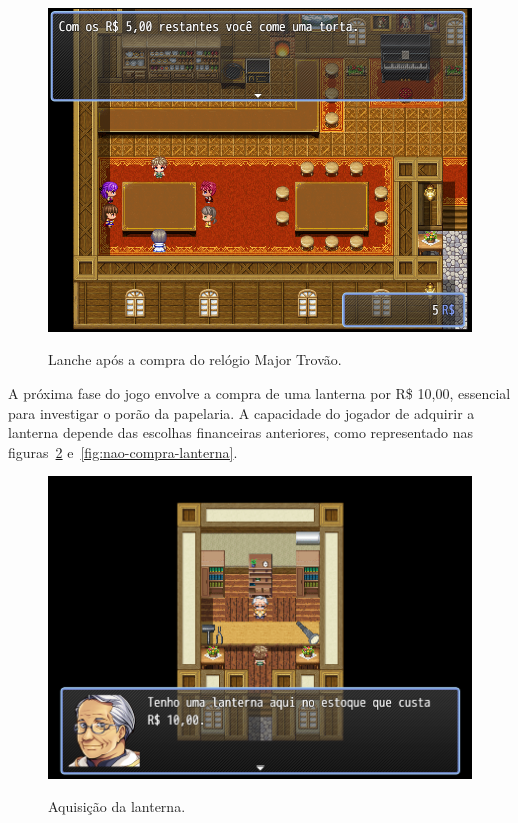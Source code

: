 \begin{figure}[!htbp]
	\centering
	\caption{Lanche após a compra do relógio Major Trovão.}
	\includegraphics[scale=0.5]{Textuais/Pictures/lanchonete-pos-relogio-mt.png}
	\label{fig:lanchonete-pos-relogio-mt}
\end{figure}

\newpage

A próxima fase do jogo envolve a compra de uma lanterna por R\$ 10,00, essencial para investigar o porão da papelaria. A capacidade do jogador de adquirir a lanterna depende das escolhas financeiras anteriores, como representado nas figuras~\ref{fig:compra-lanterna} e~\ref{fig:nao-compra-lanterna}.

\begin{figure}[!htbp]
	\centering
	\caption{Aquisição da lanterna.}
	\includegraphics[scale=0.5]{Textuais/Pictures/compra-lanterna.png}
	\label{fig:compra-lanterna}
\end{figure}

